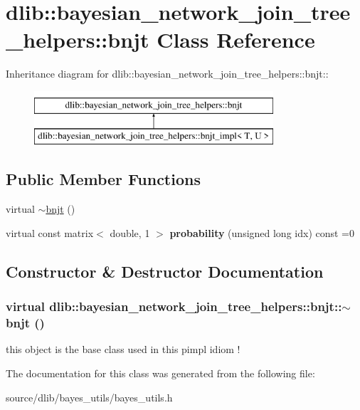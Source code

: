 \hypertarget{classdlib_1_1bayesian__network__join__tree__helpers_1_1bnjt}{
\section{dlib::bayesian\_\-network\_\-join\_\-tree\_\-helpers::bnjt Class Reference}
\label{classdlib_1_1bayesian__network__join__tree__helpers_1_1bnjt}
}
Inheritance diagram for dlib::bayesian\_\-network\_\-join\_\-tree\_\-helpers::bnjt::\begin{figure}[H]
\begin{center}
\leavevmode
\includegraphics[height=2cm]{classdlib_1_1bayesian__network__join__tree__helpers_1_1bnjt}
\end{center}
\end{figure}
\subsection*{Public Member Functions}
\begin{DoxyCompactItemize}
\item 
virtual \hyperlink{classdlib_1_1bayesian__network__join__tree__helpers_1_1bnjt_adb02abc4db9a1dad2489a8fd9bd37a14}{$\sim$bnjt} ()
\item 
\hypertarget{classdlib_1_1bayesian__network__join__tree__helpers_1_1bnjt_a10b7f9fd3a915858faaa71b70335ec5b}{
virtual const matrix$<$ double, 1 $>$ {\bfseries probability} (unsigned long idx) const =0}
\label{classdlib_1_1bayesian__network__join__tree__helpers_1_1bnjt_a10b7f9fd3a915858faaa71b70335ec5b}

\end{DoxyCompactItemize}


\subsection{Constructor \& Destructor Documentation}
\hypertarget{classdlib_1_1bayesian__network__join__tree__helpers_1_1bnjt_adb02abc4db9a1dad2489a8fd9bd37a14}{
\subsubsection[{$\sim$bnjt}]{\setlength{\rightskip}{0pt plus 5cm}virtual dlib::bayesian\_\-network\_\-join\_\-tree\_\-helpers::bnjt::$\sim$bnjt ()}}
\label{classdlib_1_1bayesian__network__join__tree__helpers_1_1bnjt_adb02abc4db9a1dad2489a8fd9bd37a14}
this object is the base class used in this pimpl idiom ! 

The documentation for this class was generated from the following file:\begin{DoxyCompactItemize}
\item 
source/dlib/bayes\_\-utils/bayes\_\-utils.h\end{DoxyCompactItemize}
